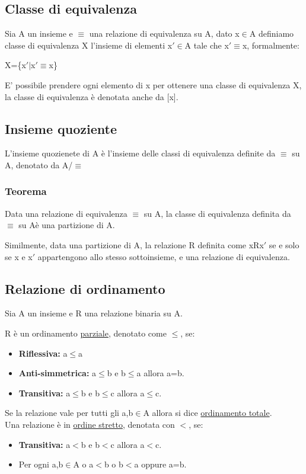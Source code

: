 \documentclass{book}
\begin{document}
    \subsection{Classe di equivalenza}
    Sia A un insieme e $\equiv$ una relazione di equivalenza su A, dato x$\in$A definiamo classe di equivalenza  X l'insieme di elementi x$\prime \in$A tale che x$\prime \equiv$x, formalmente:
    \begin{center}
        X=\{x$\prime | $x$\prime \equiv$x\}
    \end{center}
    E' possibile prendere ogni elemento di x per ottenere una classe di equivalenza X, la classe di equivalenza è denotata anche da [x].

    \subsection{Insieme quoziente}
    L'insieme quozienete di A è l'insieme delle classi di equivalenza definite da $\equiv$ su A, denotato da A/$\equiv$

    \subsubsection{Teorema}
    Data una relazione di equivalenza $\equiv$ su A, la classe di equivalenza definita da $\equiv$ su Aè una partizione di A.


    Similmente, data una partizione di A, la relazione R definita come xRx$\prime$ se e solo se x e x$\prime$ appartengono allo stesso sottoinsieme, e una relazione di equivalenza.

    \subsection{Relazione di ordinamento}
    Sia A un insieme e R una relazione binaria su A.


    R è un ordinamento \underline{parziale}, denotato come $\leq$, se:
    \begin{itemize}
        \item \textbf{Riflessiva:} a$\leq$a
        \item \textbf{Anti-simmetrica:} a$\leq$b e b$\leq$a allora a=b.
        \item \textbf{Transitiva:} a$\leq$b e b$\leq$c allora a$\leq$c.
    \end{itemize}
    Se la relazione vale per tutti gli a,b$\in$A allora si dice \underline{ordinamento totale}.\\
    Una relazione è in \underline{ordine stretto}, denotata con $<$, se:
    \begin{itemize}
        \item \textbf{Transitiva:} a$<$b e b$<$c allora a$<$c.
        \item Per ogni a,b$\in$A o a$<$b o b$<$a oppure a=b.
    \end{itemize}
\end{document}
